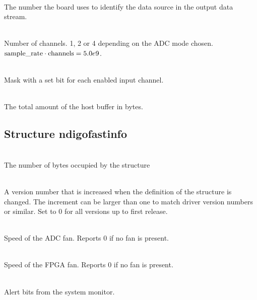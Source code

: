             \\
            The number the board uses to identify the data source in the output data stream.\par

            \\
            Number of channels. 1, 2 or 4 depending on the ADC mode chosen. $\text{sample\textunderscore rate}\cdot\text{channels} = 5.0e9$.\par

            \\
            Mask with a set bit for each enabled input channel.\par

            \\
            The total amount of the host buffer in bytes.\par


        \subsection{Structure ndigo\tu fast\tu info}

            \\
            The number of bytes occupied by the structure\par

            \\
            A version number that is increased when the definition of the structure is changed. The increment can be larger than one to match driver version numbers or similar. Set to 0 for all versions up to first release.\par

            \\
            Speed of the ADC fan. Reports 0 if no fan is present.\par

            \\
            Speed of the FPGA fan. Reports 0 if no fan is present.\par

            \\
            Alert bits from the system monitor.\par

